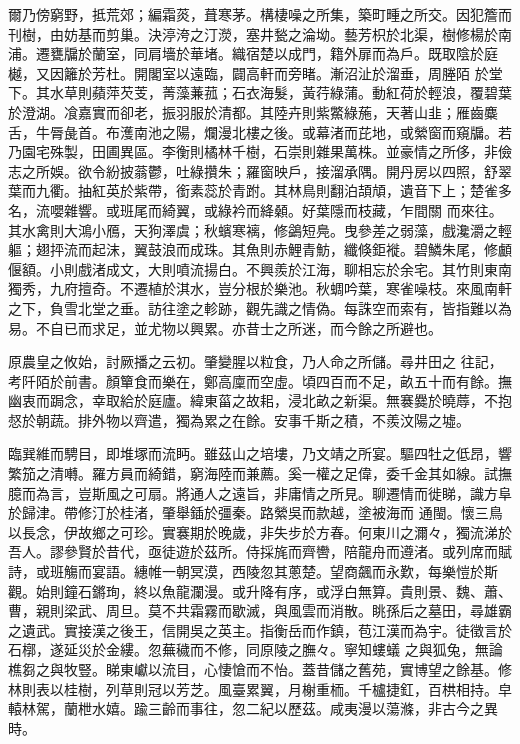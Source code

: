 \begin{pinyinscope}
 爾乃傍窮野，抵荒郊；編霜菼，葺寒茅。構棲噪之所集，築町畽之所交。因犯簷而刊樹，由妨基而剪巢。決渟洿之汀濙，塞井甃之淪坳。藝芳枳於北渠，樹修楊於南浦。遷甕牖於蘭室，同肩墻於華堵。織宿楚以成門，籍外扉而為戶。既取陰於庭樾，又因籬於芳杜。開閣室以遠臨，闢高軒而旁睹。漸沼沚於溜垂，周塍陌
 於堂下。其水草則蘋萍芡芰，菁藻蒹菰；石衣海髮，黃荇綠蒲。動紅荷於輕浪，覆碧葉於澄湖。飡嘉實而卻老，振羽服於清都。其陸卉則紫鱉綠葹，天著山韭；雁齒麋舌，牛脣彘首。布濩南池之陽，爛漫北樓之後。或幕渚而芘地，或縈窗而窺牖。若乃園宅殊製，田圃異區。李衡則橘林千樹，石崇則雜果萬株。並豪情之所侈，非儉志之所娛。欲令紛披蓊鬱，吐綠攢朱；羅窗映戶，接溜承隅。開丹房以四照，舒翠葉而九衢。抽紅英於紫帶，銜素蕊於青跗。其林鳥則翻泊頡頏，遺音下上；楚雀多名，流嚶雜響。或班尾而綺翼，或綠衿而絳顙。好葉隱而枝藏，乍間關
 而來往。其水禽則大鴻小鴈，天狗澤虞；秋蠙寒褵，修鷁短鳧。曳參差之弱藻，戲瀺灂之輕軀；翅抨流而起沫，翼鼓浪而成珠。其魚則赤鯉青魴，纖倏鉅褷。碧鱗朱尾，修顱偃額。小則戲渚成文，大則噴流揚白。不興羨於江海，聊相忘於余宅。其竹則東南獨秀，九府擅奇。不遷植於淇水，豈分根於樂池。秋蜩吟葉，寒雀噪枝。來風南軒之下，負雪北堂之垂。訪往塗之軫跡，觀先識之情偽。每誅空而索有，皆指難以為易。不自已而求足，並尤物以興累。亦昔士之所迷，而今餘之所避也。



 原農皇之攸始，討厥播之云初。肇變腥以粒食，乃人命之所儲。尋井田之
 往記，考阡陌於前書。顏簞食而樂在，鄭高廩而空虛。頃四百而不足，畝五十而有餘。撫幽衷而跼念，幸取給於庭廬。緯東菑之故耜，浸北畝之新渠。無褰爨於曉蓐，不抱惄於朝蔬。排外物以齊遣，獨為累之在餘。安事千斯之積，不羨汶陽之墟。



 臨巽維而騁目，即堆塚而流眄。雖茲山之培塿，乃文靖之所宴。驅四牡之低昂，響繁笳之清囀。羅方員而綺錯，窮海陸而兼薦。奚一權之足偉，委千金其如線。試撫臆而為言，豈斯風之可扇。將通人之遠旨，非庸情之所見。聊遷情而徙睇，識方阜於歸津。帶修汀於桂渚，肇舉鍤於彊秦。路縈吳而款越，塗被海而
 通閩。懷三鳥以長念，伊故鄉之可珍。實褰期於晚歲，非失步於方春。何東川之濔々，獨流涕於吾人。謬參賢於昔代，亟徒遊於茲所。侍採旄而齊轡，陪龍舟而遵渚。或列席而賦詩，或班觴而宴語。繐帷一朝冥漠，西陵忽其蔥楚。望商飆而永歎，每樂愷於斯觀。始則鐘石鏘珣，終以魚龍瀾漫。或升降有序，或浮白無算。貴則景、魏、蕭、曹，親則梁武、周旦。莫不共霜霧而歇滅，與風雲而消散。眺孫后之墓田，尋雄霸之遺武。實接漢之後王，信開吳之英主。指衡岳而作鎮，苞江漢而為宇。徒徵言於石槨，遂延災於金縷。忽蕪穢而不修，同原陵之膴々。寧知螻蟻
 之與狐兔，無論樵芻之與牧豎。睇東巘以流目，心悽愴而不怡。蓋昔儲之舊苑，實博望之餘基。修林則表以桂樹，列草則冠以芳芝。風臺累翼，月榭重栭。千櫨捷釭，百栱相持。皁轅林駕，蘭枻水嬉。踰三齡而事往，忽二紀以歷茲。咸夷漫以蕩滌，非古今之異時。



\end{pinyinscope}
